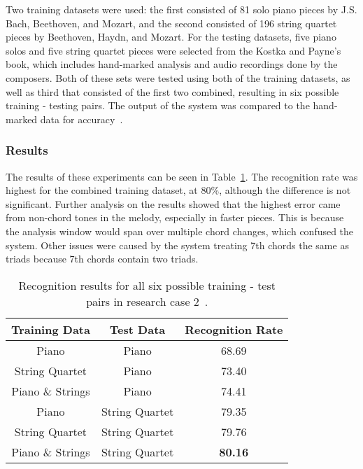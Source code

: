 \documentclass{sig-alternate}
\begin{document}
Two training datasets were used: the first consisted of 81 solo piano pieces by J.S. Bach, Beethoven, and Mozart, and the second consisted of 196 string quartet pieces by Beethoven, Haydn, and Mozart. For the testing datasets, five piano solos and five string quartet pieces were selected from the Kostka and Payne's book, which includes hand-marked analysis and audio recordings done by the composers. Both of these sets were tested using both of the training datasets, as well as third that consisted of the first two combined, resulting in six possible training - testing pairs. The output of the system was compared to the hand-marked data for accuracy~\cite{Lee:2006}. 

\subsubsection{Results}

The results of these experiments can be seen in Table~\ref{tab:tab5}. The recognition rate was highest for the combined training dataset, at 80\%, although the difference is not significant. Further analysis on the results showed that the highest error came from non-chord tones in the melody, especially in faster pieces. This is because the analysis window would span over multiple chord changes, which confused the system. Other issues were caused by the system treating 7th chords the same as triads because 7th chords contain two triads.

\begin{table}[b]
\centering
\begin{tabular}{|c|c|c|} \hline
\textbf{Training Data} & \textbf{Test Data} & \textbf{Recognition Rate} \\ \hline
Piano & Piano & 68.69 \\ \hline
String Quartet & Piano & 73.40 \\ \hline
Piano \& Strings & Piano & 74.41 \\ \hline
Piano & String Quartet & 79.35 \\ \hline
String Quartet & String Quartet & 79.76 \\ \hline
Piano \& Strings & String Quartet & \textbf{80.16} \\ \hline
\end{tabular}
\caption{Recognition results for all six possible training - test pairs in research case 2~\cite{Lee:2006}.}
\label{tab:tab5}
\end{table}
\end{document}

